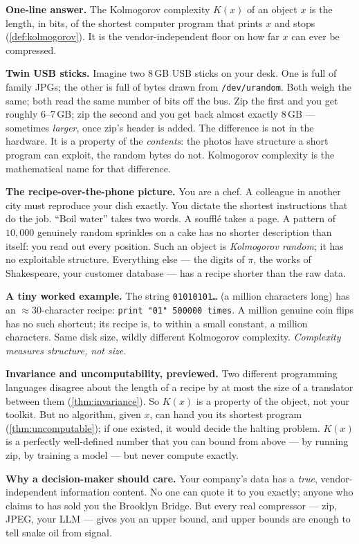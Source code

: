 \documentclass[12pt,a4paper]{article}
\theoremstyle{plain}
\theoremstyle{definition}
\begin{document}
\begin{intuition}
\textbf{One-line answer.}  The Kolmogorov complexity $K(x)$ of an
object $x$ is the length, in bits, of the shortest computer program
that prints $x$ and stops (\cref{def:kolmogorov}).  It is the
vendor-independent floor on how far $x$ can ever be compressed.

\textbf{Twin USB sticks.}  Imagine two 8\,GB USB sticks on your desk.
One is full of family JPGs; the other is full of bytes drawn from
\texttt{/dev/urandom}.  Both weigh the same; both read the same number
of bits off the bus.  Zip the first and you get roughly
$6$--$7\,\text{GB}$; zip the second and you get back almost exactly
$8\,\text{GB}$ --- sometimes \emph{larger}, once zip's header is added.
The difference is not in the hardware.  It is a property of the
\emph{contents}: the photos have structure a short program can
exploit, the random bytes do not.  Kolmogorov complexity is the
mathematical name for that difference.

\textbf{The recipe-over-the-phone picture.}  You are a chef.  A
colleague in another city must reproduce your dish exactly.  You
dictate the shortest instructions that do the job.  ``Boil water''
takes two words.  A souffl\'e takes a page.  A pattern of $10{,}000$
genuinely random sprinkles on a cake has no shorter description than
itself: you read out every position.  Such an object is
\emph{Kolmogorov random}; it has no exploitable structure.  Everything
else --- the digits of $\pi$, the works of Shakespeare, your customer
database --- has a recipe shorter than the raw data.

\textbf{A tiny worked example.}  The string \texttt{01010101\ldots} (a
million characters long) has an $\approx 30$-character recipe:
\texttt{print "01" 500000 times}.  A million genuine coin flips has no
such shortcut; its recipe is, to within a small constant, a million
characters.  Same disk size, wildly different Kolmogorov complexity.
\emph{Complexity measures structure, not size.}

\textbf{Invariance and uncomputability, previewed.}  Two different
programming languages disagree about the length of a recipe by at most
the size of a translator between them (\cref{thm:invariance}).  So
$K(x)$ is a property of the object, not your toolkit.  But no
algorithm, given $x$, can hand you its shortest program
(\cref{thm:uncomputable}); if one existed, it would decide the halting
problem.  $K(x)$ is a perfectly well-defined number that you can bound
from above --- by running zip, by training a model --- but never
compute exactly.

\textbf{Why a decision-maker should care.}  Your company's data has a
\emph{true}, vendor-independent information content.  No one can quote
it to you exactly; anyone who claims to has sold you the Brooklyn
Bridge.  But every real compressor --- zip, JPEG, your LLM --- gives
you an upper bound, and upper bounds are enough to tell snake oil from
signal.
\end{intuition}
\end{document}
